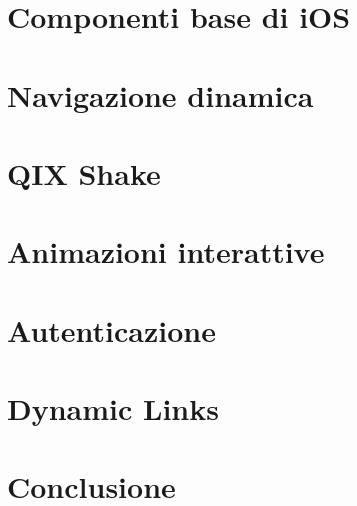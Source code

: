 \documentclass[12pt,a4paper]{book}
\begin{document}
    \chapter{Componenti base di iOS }
    \label{CH:2}
    

    \chapter{Navigazione dinamica}
    \label{CH:3}
    

    \chapter{QIX Shake}
    \label{CH:4}
    
    
    \chapter{Animazioni interattive}
    \label{CH:5}
    

    \chapter{Autenticazione}
    \label{CH:6}
    
    
    \chapter{Dynamic Links}
    \label{CH:7}
    
    
    \chapter*{Conclusione}
    \label{CH:Concl}
    
    
    
    
    
    
    \listoffigures
\end{document}
